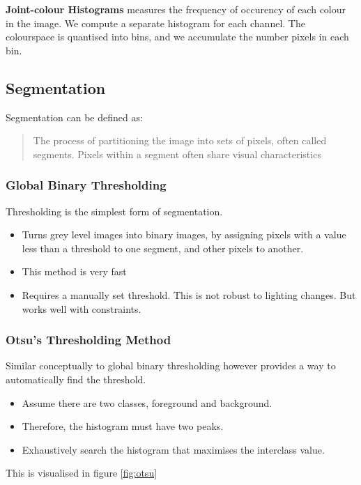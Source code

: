 \textbf{Joint-colour Histograms} measures the frequency of occurency of each colour in the image. We compute a separate histogram for each channel. The colourspace is quantised into bins, and we accumulate the number pixels in each bin.

\subsection{Segmentation}
Segmentation can be defined as:

\begin{quote}
    The process of partitioning the image into sets of pixels, often called segments. Pixels within a segment often share visual characteristics
\end{quote}

\subsubsection{Global Binary Thresholding}
Thresholding is the simplest form of segmentation.
\begin{itemize}
    \itemsep0em
    \item Turns grey level images into binary images, by assigning pixels with a value less than a threshold to one segment, and other pixels to another.
    \item This method is very fast
    \item Requires a manually set threshold. This is not robust to lighting changes. But works well with constraints.
\end{itemize}

\subsubsection{Otsu's Thresholding Method}
Similar conceptually to global binary thresholding however provides a way to automatically find the threshold.

\begin{itemize}
    \itemsep0em
    \item Assume there are two classes, foreground and background.
    \item Therefore, the histogram must have two peaks.
    \item Exhaustively search the histogram that maximises the interclass value.
\end{itemize}

This is visualised in figure \ref{fig:otsu}

